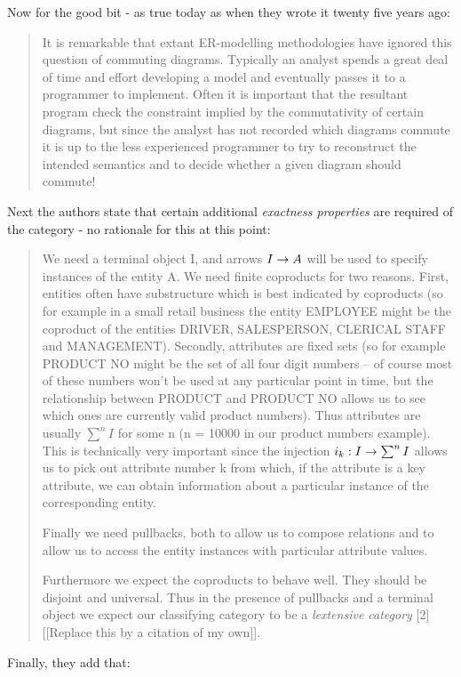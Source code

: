\documentclass[10pt,a4paper]{scrartcl}
\begin{document}
Now for the good bit - as true today as when they wrote it twenty five years ago:
\begin{quote}
It is remarkable that extant ER-modelling methodologies have ignored this
question of commuting diagrams. Typically an analyst spends a great deal of
time and effort developing a model and eventually passes it to a programmer
to implement. Often it is important that the resultant program check the 
constraint implied by the commutativity of certain diagrams, but since the analyst
has not recorded which diagrams commute it is up to the less experienced 
programmer to try to reconstruct the intended semantics and to decide whether a
given diagram should commute!
\end{quote}

Next the authors state that certain additional \textit{exactness properties} are required of the category
- no rationale for this at this point:
\begin{quote}
We need a terminal object I, 
and arrows $I \rightarrow A$ will be used to specify instances of the entity A. We
need finite coproducts for two reasons. First, entities often have substructure
which is best indicated by coproducts (so for example in a small retail 
business the entity EMPLOYEE might be the coproduct of the entities DRIVER,
SALESPERSON, CLERICAL STAFF and MANAGEMENT). Secondly, attributes
are fixed sets (so for example PRODUCT NO might be the set of all four digit
numbers -- of course most of these numbers won't be used at any particular point
in time, but the relationship between PRODUCT and PRODUCT NO allows us
to see which ones are currently valid product numbers). Thus attributes are
usually $\sum^nI $ for some n (n = 10000 in our product numbers example). This
is technically very important since the injection $i_k:I \rightarrow \sum^nI$  allows us to
pick out attribute number k from which, if the attribute is a key attribute, we
can obtain information about a particular instance of the corresponding entity.

Finally we need pullbacks, both to allow us to compose relations and to allow
us to access the entity instances with particular attribute values.

Furthermore we expect the coproducts to behave well. They should be
disjoint and universal. Thus in the presence of pullbacks and a 
terminal object
we expect our classifying category to be a \textit{lextensive category} [2] [[Replace this by a citation of my own]].
\end{quote}
Finally, they add that:
\end{document}
